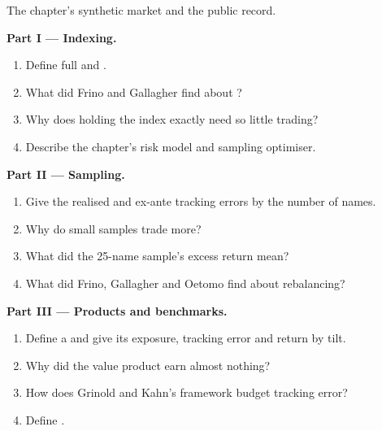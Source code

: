 \begin{problem}\label{pb:s1:the-asset-managers-strategies:1}
The chapter's synthetic market and the public record.

\medskip\noindent\textbf{Part I --- Indexing.}
\begin{enumerate}
\item Define full and .
\item What did Frino and Gallagher find about ?
\item Why does holding the index exactly need so little trading?
\item Describe the chapter's risk model and sampling optimiser.
\end{enumerate}

\medskip\noindent\textbf{Part II --- Sampling.}
\begin{enumerate}[resume]
\item Give the realised and ex-ante tracking errors by the number of names.
\item Why do small samples trade more?
\item What did the 25-name sample's excess return mean?
\item What did Frino, Gallagher and Oetomo find about rebalancing?
\end{enumerate}

\medskip\noindent\textbf{Part III --- Products and benchmarks.}
\begin{enumerate}[resume]
\item Define a  and give its exposure, tracking error and return by tilt.
\item Why did the value product earn almost nothing?
\item How does Grinold and Kahn's framework budget tracking error?
\item Define .
\end{enumerate}


\end{problem}
